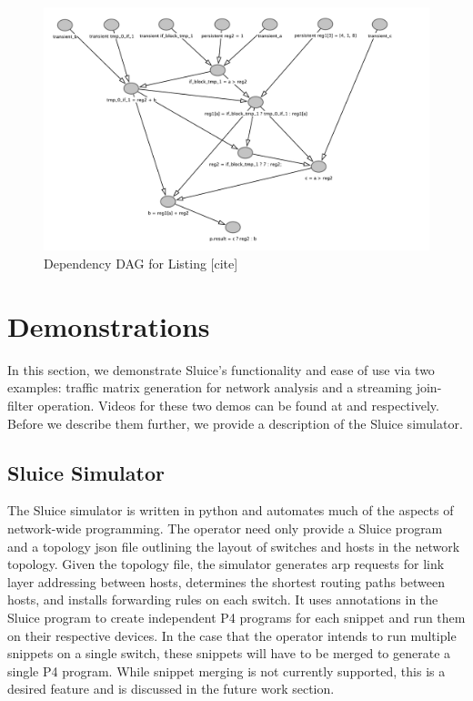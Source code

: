 \documentclass[12pt, oneside]{article}
\begin{document}
\begin{figure}
\centering
\includegraphics[width=175mm,scale=1]{figures/dependency_dag.pdf}
\caption{Dependency DAG for Listing [cite]}
\end{figure}

 

\newpage
\section{Demonstrations} 
In this section, we demonstrate Sluice's functionality and ease of use via two examples: traffic matrix generation for network analysis and a streaming join-filter operation. Videos for these two demos can be found at \cite{traf} and \cite{stream} respectively. Before we describe them further, we provide a description of the Sluice simulator.

\subsection{Sluice Simulator}
The Sluice simulator is written in python and automates much of the aspects of network-wide programming. The operator need only provide a Sluice program and a topology json file outlining the layout of switches and hosts in the network topology. Given the topology file, the simulator generates arp requests for link layer addressing between hosts, determines the shortest routing paths between hosts, and installs forwarding rules on each switch. It uses annotations in the Sluice program to create independent P4 programs for each snippet and run them on their respective devices. In the case that the operator intends to run multiple snippets on a single switch, these snippets will have to be merged to generate a single P4 program. While snippet merging is not currently supported, this is a desired feature and is discussed in the future work section. 
\end{document}
